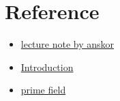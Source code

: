 



    


\section{Reference}

\begin{itemize}
    \item \href{https://www.ma.imperial.ac.uk/~anskor/notesM2P4.pdf}{lecture note by anskor}
    \item \href{https://www.math.rwth-aachen.de/~Max.Neunhoeffer/Teaching/ff/ffchap1.pdf}{Introduction}
    \item \href{https://www.math.rwth-aachen.de/~Max.Neunhoeffer/Teaching/ff/ffchap2.pdf}{prime field}
\end{itemize}